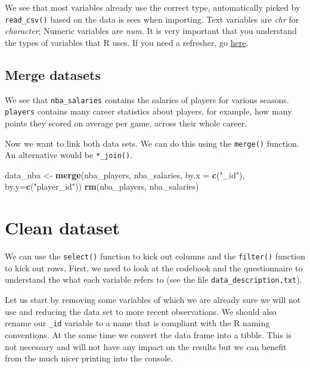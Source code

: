\documentclass[
]{book}
\newenvironment{Shaded}{\begin{snugshade}}{\end{snugshade}}
\newcommand{\AttributeTok}[1]{\textcolor[rgb]{0.13,0.29,0.53}{#1}}
\newcommand{\FunctionTok}[1]{\textcolor[rgb]{0.13,0.29,0.53}{\textbf{#1}}}
\newcommand{\NormalTok}[1]{#1}
\newcommand{\OtherTok}[1]{\textcolor[rgb]{0.56,0.35,0.01}{#1}}
\newcommand{\StringTok}[1]{\textcolor[rgb]{0.31,0.60,0.02}{#1}}
\begin{document}
We see that most variables already use the correct type, automatically picked by \texttt{read\_csv()} based on the data is sees when importing. Text variables are \emph{chr} for \emph{character}; Numeric variables are \emph{num}. It is very important that you understand the types of variables that R uses. If you need a refresher, go \href{https://jaspertjaden.github.io/course-intro2r/week2.html\#data-types}{here}.

\hypertarget{merge-datasets}{%
\subsection{Merge datasets}\label{merge-datasets}}

We see that \texttt{nba\_salaries} contains the salaries of players for various seasons. \texttt{players} contains many career statistics about players, for example, how many points they scored on average per game, across their whole career.

Now we want to link both data sets. We can do this using the \texttt{merge()} function. An alternative would be \texttt{*\_join()}.

\begin{Shaded}
\begin{Highlighting}[]
\NormalTok{data\_nba }\OtherTok{\textless{}{-}} \FunctionTok{merge}\NormalTok{(nba\_players, nba\_salaries, }\AttributeTok{by.x =} \FunctionTok{c}\NormalTok{(}\StringTok{"\_id"}\NormalTok{), }\AttributeTok{by.y=}\FunctionTok{c}\NormalTok{(}\StringTok{"player\_id"}\NormalTok{))}
\FunctionTok{rm}\NormalTok{(nba\_players, nba\_salaries)}
\end{Highlighting}
\end{Shaded}

\hypertarget{clean-dataset}{%
\section{Clean dataset}\label{clean-dataset}}

We can use the \texttt{select()} function to kick out columns and the \texttt{filter()} function to kick out rows. First, we need to look at the codebook and the questionnaire to understand the what each variable refers to (see the file \texttt{data\_description.txt}).

Let us start by removing some variables of which we are already sure we will not use and reducing the data set to more recent observations. We should also rename our \texttt{\_id} variable to a name that is compliant with the R naming conventions. At the same time we convert the data frame into a tibble. This is not necessary and will not have any impact on the results but we can benefit from the much nicer printing into the console.
\end{document}
